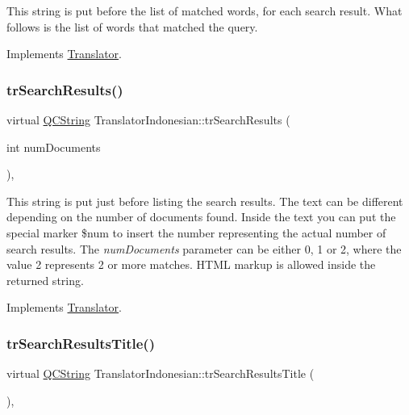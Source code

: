 This string is put before the list of matched words, for each search result. What follows is the list of words that matched the query. 

Implements \mbox{\hyperlink{class_translator}{Translator}}.

\mbox{\label{class_translator_indonesian_a050dc79ac095dd5dfc64f1c2698fef4d}} 
\subsubsection{\texorpdfstring{trSearchResults()}{trSearchResults()}}
{\footnotesize\ttfamily virtual \mbox{\hyperlink{class_q_c_string}{Q\+C\+String}} Translator\+Indonesian\+::tr\+Search\+Results (\begin{DoxyParamCaption}\item[{int}]{num\+Documents }\end{DoxyParamCaption})\hspace{0.3cm}{\ttfamily [inline]}, {\ttfamily [virtual]}}

This string is put just before listing the search results. The text can be different depending on the number of documents found. Inside the text you can put the special marker \$num to insert the number representing the actual number of search results. The {\itshape num\+Documents} parameter can be either 0, 1 or 2, where the value 2 represents 2 or more matches. H\+T\+ML markup is allowed inside the returned string. 

Implements \mbox{\hyperlink{class_translator}{Translator}}.

\mbox{\label{class_translator_indonesian_a803f950a37f6e33a1dbefc346591c50f}} 
\subsubsection{\texorpdfstring{trSearchResultsTitle()}{trSearchResultsTitle()}}
{\footnotesize\ttfamily virtual \mbox{\hyperlink{class_q_c_string}{Q\+C\+String}} Translator\+Indonesian\+::tr\+Search\+Results\+Title (\begin{DoxyParamCaption}{ }\end{DoxyParamCaption})\hspace{0.3cm}{\ttfamily [inline]}, {\ttfamily [virtual]}}

